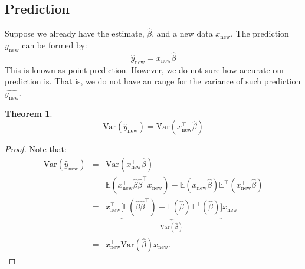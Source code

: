 \documentclass{article}
\theoremstyle{MyNonumberplain}
\theoremstyle{break}
\newtheorem*{proof}{Proof. }
\newcommand{\ev}{\mathbb{E}}
\newcommand{\var}{\text{Var}}
\newcommand{\T}{^\intercal}
\theoremstyle{break}
\newtheorem{theorem}{Theorem}[section]
\begin{document}
\subsection{Prediction}

Suppose we already have the estimate, $\hat\beta$, and a new data $x_{\text{new}}$. The prediction $y_{\text{new}}$ can be formed by:
    $$\hat{y}_{\text{new}}=x_{\text{new}}\T\hat\beta$$
This is known as point prediction. 
However, we do not sure how accurate our prediction is. 
That is, we do not have an range for the variance of such prediction $\hat{y_{\text{new}}}$.

\begin{thmbox}
    \begin{theorem}
        $$\var(\hat{y}_{\text{new}}) = \var({x}_{\text{new}}\T\hat\beta)$$
    \end{theorem}
    \begin{prfbox}
        \begin{proof}
            Note that:
        \begin{eqnarray*}
            \var(\hat{y}_{\text{new}}) &=& \var({x}_{\text{new}}\T\hat\beta)\\
                                    &=& \ev({x}_{\text{new}}\T\hat\beta\hat\beta\T {x}_{\text{new}}) - \ev({x}_{\text{new}}\T\hat\beta)\ev\T({x}_{\text{new}}\T\hat\beta)\\
                                    &=& {x}_{\text{new}}\T \underbrace{\Biggl[\ev(\hat\beta\hat\beta\T) - \ev(\hat\beta)\ev\T(\hat\beta)\Biggr]}_{\var(\hat\beta)} {x}_{\text{new}}\\
                                    &=& {x}_{\text{new}}\T\var(\hat\beta){x}_{\text{new}}.
        \end{eqnarray*}

        \end{proof}
    \end{prfbox}
\end{thmbox}


\begin{center}
\end{center}
\end{document}
